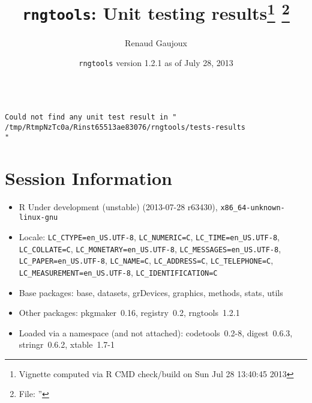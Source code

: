 \documentclass[10pt]{article}
\author{Renaud Gaujoux}
\title{\texttt{rngtools}: Unit testing results\footnote{Vignette computed  via R CMD check/build  on Sun Jul 28 13:40:45 2013} \footnote{File: ''}}
\date{\texttt{rngtools} version 1.2.1 as of July 28, 2013}
\begin{document}
\maketitle

\begin{verbatim}

Could not find any unit test result in "
/tmp/RtmpNzTc0a/Rinst65513ae83076/rngtools/tests-results
"

\end{verbatim}

\section*{Session Information}
\begin{itemize}\raggedright
  \item R Under development (unstable) (2013-07-28 r63430), \verb|x86_64-unknown-linux-gnu|
  \item Locale: \verb|LC_CTYPE=en_US.UTF-8|, \verb|LC_NUMERIC=C|, \verb|LC_TIME=en_US.UTF-8|, \verb|LC_COLLATE=C|, \verb|LC_MONETARY=en_US.UTF-8|, \verb|LC_MESSAGES=en_US.UTF-8|, \verb|LC_PAPER=en_US.UTF-8|, \verb|LC_NAME=C|, \verb|LC_ADDRESS=C|, \verb|LC_TELEPHONE=C|, \verb|LC_MEASUREMENT=en_US.UTF-8|, \verb|LC_IDENTIFICATION=C|
  \item Base packages: base, datasets, grDevices, graphics, methods,
    stats, utils
  \item Other packages: pkgmaker~0.16, registry~0.2, rngtools~1.2.1
  \item Loaded via a namespace (and not attached): codetools~0.2-8,
    digest~0.6.3, stringr~0.6.2, xtable~1.7-1
\end{itemize}
\end{document}
